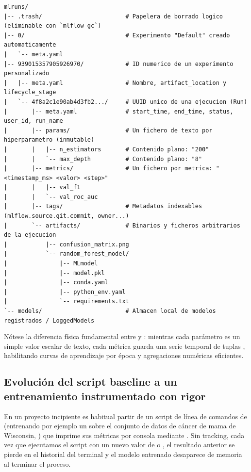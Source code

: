 \begin{lstlisting}[style=bash, caption={Anatomía real del directorio mlruns/ en modo FileStore local.}, label={lst:mlruns-anatomia}]
mlruns/
|-- .trash/                        # Papelera de borrado logico (eliminable con `mlflow gc`)
|-- 0/                             # Experimento "Default" creado automaticamente
|   `-- meta.yaml
|-- 939015357905926970/            # ID numerico de un experimento personalizado
|   |-- meta.yaml                  # Nombre, artifact_location y lifecycle_stage
|   `-- 4f8a2c1e90ab4d3fb2.../     # UUID unico de una ejecucion (Run)
|       |-- meta.yaml              # start_time, end_time, status, user_id, run_name
|       |-- params/                # Un fichero de texto por hiperparametro (inmutable)
|       |   |-- n_estimators       # Contenido plano: "200"
|       |   `-- max_depth          # Contenido plano: "8"
|       |-- metrics/               # Un fichero por metrica: "<timestamp_ms> <valor> <step>"
|       |   |-- val_f1
|       |   `-- val_roc_auc
|       |-- tags/                  # Metadatos indexables (mlflow.source.git.commit, owner...)
|       `-- artifacts/             # Binarios y ficheros arbitrarios de la ejecucion
|           |-- confusion_matrix.png
|           `-- random_forest_model/
|               |-- MLmodel
|               |-- model.pkl
|               |-- conda.yaml
|               |-- python_env.yaml
|               `-- requirements.txt
`-- models/                        # Almacen local de modelos registrados / LoggedModels
\end{lstlisting}

Nótese la diferencia física fundamental entre  y : mientras cada parámetro es un simple valor escalar de texto, cada métrica guarda una serie temporal de tuplas , habilitando curvas de aprendizaje por época y agregaciones numéricas eficientes.

\subsection{Evolución del script baseline a un entrenamiento instrumentado con rigor}

En un proyecto incipiente es habitual partir de un script de línea de comandos de  (entrenando por ejemplo un  sobre el conjunto de datos de cáncer de mama de Wisconsin, ) que imprime sus métricas por consola mediante . Sin tracking, cada vez que ejecutamos el script con un nuevo valor de  o , el resultado anterior se pierde en el historial del terminal y el modelo entrenado desaparece de memoria al terminar el proceso.

